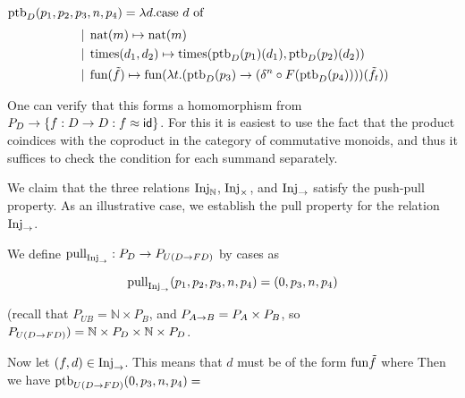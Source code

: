 %
%

$\text{ptb}_D(p_1, p_2, p_3, n, p_4) = \lambda d.\text{case $d$ of}$
\begin{align*}
    &\mathrel{\bf \,\mid\,} \text{nat}(m) \mapsto \text{nat}(m) \\
    &\mathrel{\bf \,\mid\,} \text{times}(d_1, d_2) \mapsto {\text{times}(\text{ptb}_D(p_1)(d_1), \text{ptb}_D(p_2)(d_2))} \\
    &\mathrel{\bf \,\mid\,} \text{fun}(\tilde{f}) \mapsto {\text{fun}(\lambda t. (\text{ptb}_D(p_3) \to(\delta^n \circ F(\text{ptb}_D(p_4))))(\tilde{f}_t))} \\
\end{align*}

One can verify that this forms a homomorphism from $P_D \to \{ f : D \to D : f \approx \mathsf{id} \}$.
For this it is easiest to use the fact that the product coindices with the coproduct
in the category of commutative monoids, and thus it suffices to check the condition for each summand separately.

We claim that the three relations $\text{Inj}_\mathbb{N}$, $\text{Inj}_\times$, and $\text{Inj}_\to$
satisfy the push-pull property.
As an illustrative case, we establish the pull property for the relation $\text{Inj}_\to$.

We define $\text{pull}_{\text{Inj}_\to} : P_D \to P_{U(D \to FD)}$ by cases as

\[ \text{pull}_{\text{Inj}_\to}(p_1, p_2, p_3, n, p_4) = (0, p_3, n, p_4) \]

(recall that $P_{UB} = \mathbb{N} \times P_B$, and $P_{A \to B} = P_A \times P_B$,
so $P_{U(D \to FD)}) = \mathbb{N} \times P_D \times \mathbb{N} \times P_D$.

Now let $(f, d) \in \text{Inj}_\to$. This means that $d$ must be of the form $\text{fun}{\tilde{f}}$ where
Then we have $\text{ptb}_{U(D \to FD)}(0, p_3, n, p_4) = $






